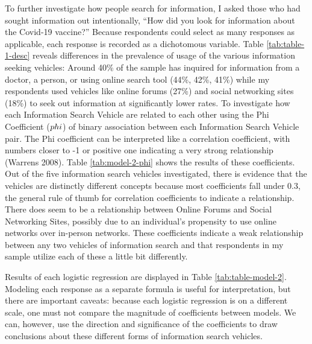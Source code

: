 To further investigate how people search for information, I asked those who had
sought information out intentionally, ``How did you look for information about
the Covid-19 vaccine?'' Because respondents could select as many responses as
applicable, each response is recorded as a dichotomous variable. Table
\ref{tab:table-1-desc} reveals differences in the prevalence of usage of the
various information seeking vehicles: Around 40\% of the sample has inquired for
information from a doctor, a person, or using online search tool (44\%, 42\%, 41\%) while my
respondents used vehicles like online forums (27\%) and social networking sites (18\%)
to seek out information at significantly lower rates. To investigate how each
Information Search Vehicle are related to each other using the Phi Coefficient
(\(\\phi\)) of binary association between each Information Search Vehicle pair.
The Phi coefficient can be interpreted like a correlation coefficient, with
numbers closer to -1 or positive one indicating a very strong relationship
(Warrens 2008). Table \ref{tab:model-2-phi} shows the results of these
coefficients. Out of the five information search vehicles investigated, there is
evidence that the vehicles are distinctly different concepts because most
coefficients fall under 0.3, the general rule of thumb for correlation
coefficients to indicate a relationship. There does seem to be a relationship
between Online Forums and Social Networking Sites, possibly due to an
individual's propensity to use online networks over in-person networks. These
coefficients indicate a weak relationship between any two vehicles of
information search and that respondents in my sample utilize each of these a
little bit differently.




Results of each logistic regression are displayed in Table \ref{tab:table-model-2}.
Modeling each response as a separate formula is useful for interpretation, but
there are important caveats: because each logistic regression is on a different
scale, one must not compare the magnitude of coefficients between models. We
can, however, use the direction and significance of the coefficients to draw
conclusions about these different forms of information search vehicles.

